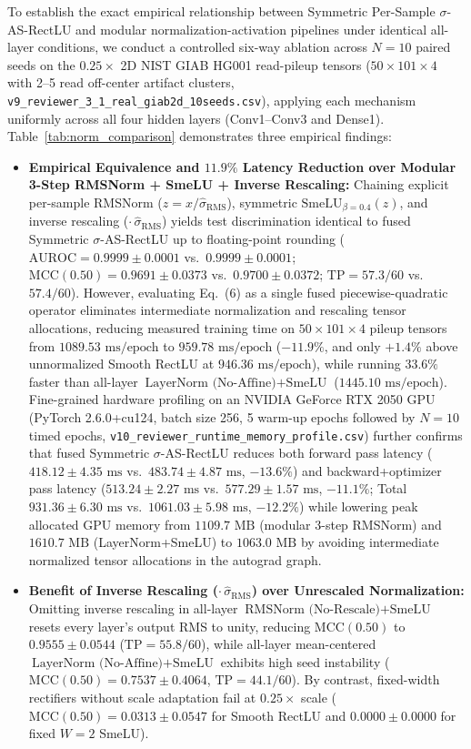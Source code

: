 \documentclass[11pt, a4paper]{article}
\begin{document}
To establish the exact empirical relationship between Symmetric Per-Sample $\sigma$-AS-RectLU and modular normalization-activation pipelines under identical all-layer conditions, we conduct a controlled six-way ablation across $N=10$ paired seeds on the $0.25\times$ 2D NIST GIAB HG001 read-pileup tensors ($50 \times 101 \times 4$ with 2--5 read off-center artifact clusters, \texttt{v9\_reviewer\_3\_1\_real\_giab2d\_10seeds.csv}), applying each mechanism uniformly across all four hidden layers (Conv1--Conv3 and Dense1). Table~\ref{tab:norm_comparison} demonstrates three empirical findings:
\begin{itemize}
    \item \textbf{Empirical Equivalence and $11.9\%$ Latency Reduction over Modular 3-Step RMSNorm + SmeLU + Inverse Rescaling:} Chaining explicit per-sample RMSNorm ($z = x/\hat{\sigma}_{\mathrm{RMS}}$), symmetric $\mathrm{SmeLU}_{\beta=0.4}(z)$, and inverse rescaling ($\cdot\,\hat{\sigma}_{\mathrm{RMS}}$) yields test discrimination identical to fused Symmetric $\sigma$-AS-RectLU up to floating-point rounding ($\mathrm{AUROC} = 0.9999 \pm 0.0001$ vs.\ $0.9999 \pm 0.0001$; $\mathrm{MCC}(0.50) = 0.9691 \pm 0.0373$ vs.\ $0.9700 \pm 0.0372$; $\mathrm{TP} = 57.3/60$ vs.\ $57.4/60$). However, evaluating Eq.~(6) as a single fused piecewise-quadratic operator eliminates intermediate normalization and rescaling tensor allocations, reducing measured training time on $50 \times 101 \times 4$ pileup tensors from $1089.53\text{ ms/epoch}$ to $959.78\text{ ms/epoch}$ ($-11.9\%$, and only $+1.4\%$ above unnormalized Smooth RectLU at $946.36\text{ ms/epoch}$), while running $33.6\%$ faster than all-layer $\text{LayerNorm (No-Affine)} + \text{SmeLU}$ ($1445.10\text{ ms/epoch}$). Fine-grained hardware profiling on an NVIDIA GeForce RTX 2050 GPU (PyTorch 2.6.0+cu124, batch size 256, 5 warm-up epochs followed by $N=10$ timed epochs, \texttt{v10\_reviewer\_runtime\_memory\_profile.csv}) further confirms that fused Symmetric $\sigma$-AS-RectLU reduces both forward pass latency ($418.12 \pm 4.35\text{ ms}$ vs.\ $483.74 \pm 4.87\text{ ms}$, $-13.6\%$) and backward+optimizer pass latency ($513.24 \pm 2.27\text{ ms}$ vs.\ $577.29 \pm 1.57\text{ ms}$, $-11.1\%$; Total $931.36 \pm 6.30\text{ ms}$ vs.\ $1061.03 \pm 5.98\text{ ms}$, $-12.2\%$) while lowering peak allocated GPU memory from $1109.7\text{ MB}$ (modular 3-step RMSNorm) and $1610.7\text{ MB}$ (LayerNorm+SmeLU) to $1063.0\text{ MB}$ by avoiding intermediate normalized tensor allocations in the autograd graph.
    \item \textbf{Benefit of Inverse Rescaling ($\cdot\,\hat{\sigma}_{\mathrm{RMS}}$) over Unrescaled Normalization:} Omitting inverse rescaling in all-layer $\text{RMSNorm (No-Rescale)} + \text{SmeLU}$ resets every layer's output RMS to unity, reducing $\mathrm{MCC}(0.50)$ to $0.9555 \pm 0.0544$ ($\mathrm{TP} = 55.8/60$), while all-layer mean-centered $\text{LayerNorm (No-Affine)} + \text{SmeLU}$ exhibits high seed instability ($\mathrm{MCC}(0.50) = 0.7537 \pm 0.4064$, $\mathrm{TP} = 44.1/60$). By contrast, fixed-width rectifiers without scale adaptation fail at $0.25\times$ scale ($\mathrm{MCC}(0.50) = 0.0313 \pm 0.0547$ for Smooth RectLU and $0.0000 \pm 0.0000$ for fixed $W=2$ SmeLU).
\end{itemize}
\end{document}
